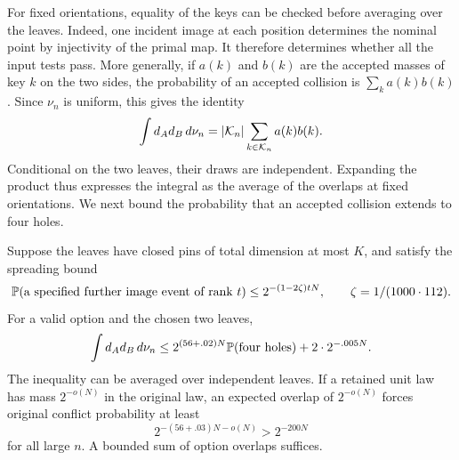 For fixed orientations, equality of the keys can be checked before
averaging over the leaves. Indeed, one incident image at each position
determines the nominal point by injectivity of the primal map. It
therefore determines whether all the input tests pass. More generally,
if \(a(k)\) and \(b(k)\) are the accepted masses of key \(k\) on the two
sides, the probability of an accepted collision is \(\sum_k a(k)b(k)\).
Since \(\nu_n\) is uniform, this gives the identity
\[
  \int d_A d_B\,d\nu_n
       =|\mathcal K_n|\sum_{k\in\mathcal K_n}a(k)b(k).
\]
Conditional on the two leaves, their draws are independent. Expanding
the product thus expresses the integral as the average of the overlaps
at fixed orientations. We next bound the probability that an accepted
collision extends to four holes.

\begin{proposition}\label{prop:collision}
Suppose the leaves have closed pins of total dimension at most \(K\),
and satisfy the spreading bound
\begin{equation}\label{eq:final-leaf-minentropy}
 \mathbb P(\text{a specified further image event of rank }t)
 \le2^{-(1-2\zeta)tN},
 \qquad \zeta=1/(1000\cdot112).
\end{equation}
For a valid option and the chosen two leaves,
\begin{equation}\label{eq:overlap-collision}
 \int d_Ad_B\,d\nu_n
 \le2^{(56+.02)N}\mathbb P(\text{four holes})+2\cdot2^{-.005N}.
\end{equation}
The inequality can be averaged over independent leaves. If a retained
unit law has mass \(2^{-o(N)}\) in the original law, an expected overlap
of \(2^{-o(N)}\) forces original conflict probability at least
\begin{equation}\label{eq:collision-conclusion}
 2^{-(56+.03)N-o(N)}>2^{-200N}
\end{equation}
for all large \(n\). A bounded sum of option overlaps suffices.
\end{proposition}
